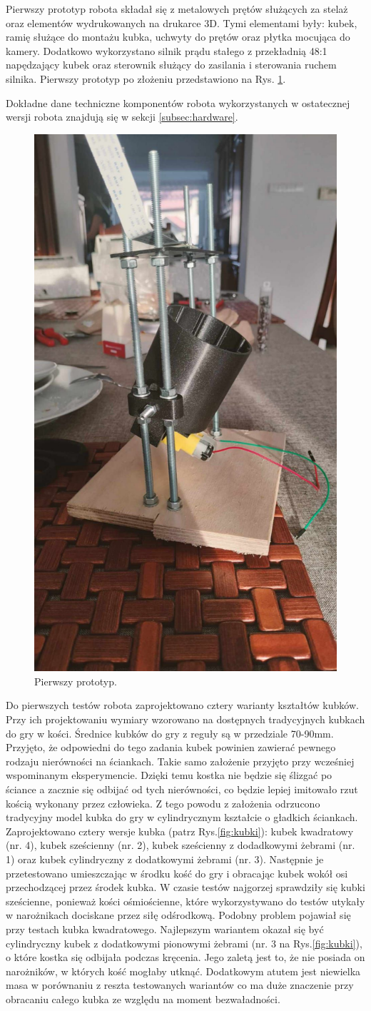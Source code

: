 Pierwszy prototyp robota składał się z metalowych prętów służących za stelaż oraz elementów wydrukowanych na drukarce 3D.
Tymi elementami były: kubek, ramię służące do montażu kubka, uchwyty do prętów oraz płytka mocująca do kamery. Dodatkowo
wykorzystano silnik prądu stałego z przekładnią 48:1 napędzający kubek oraz sterownik służący do zasilania i sterowania ruchem silnika. \cite{wheel} \cite{L298}
Pierwszy prototyp po złożeniu przedstawiono na Rys. \ref{fig:pierwszy}.

Dokładne dane techniczne komponentów robota wykorzystanych w ostatecznej wersji robota znajdują się w sekcji \ref{subsec:hardware}.

\begin{figure}[H]
    \centering
    \includegraphics[width=0.25\linewidth, trim={35mm 75mm 35mm 30mm}, clip]{chapters/03-praca-wlasna/figures/pierwszy}
    \caption{\label{fig:pierwszy}Pierwszy prototyp.}
\end{figure}

Do pierwszych testów robota zaprojektowano cztery warianty kształtów kubków. Przy ich projektowaniu wymiary wzorowano na dostępnych tradycyjnych kubkach do gry w kości.
Średnice kubków do gry z reguły są w przedziale 70-90mm.\cite{cup} Przyjęto, że odpowiedni do tego zadania kubek powinien
zawierać pewnego rodzaju nierówności na ściankach. Takie samo założenie przyjęto przy wcześniej wspominanym eksperymencie.\cite{PK} Dzięki temu kostka nie będzie się ślizgać po ściance a zacznie się odbijać od tych nierówności, co 
będzie lepiej imitowało rzut kością wykonany przez człowieka. Z tego powodu z założenia odrzucono tradycyjny model kubka do gry w cylindrycznym kształcie 
o gładkich ściankach. Zaprojektowano cztery wersje kubka (patrz Rys.\ref{fig:kubki}): kubek kwadratowy (nr. 4), kubek sześcienny (nr. 2), kubek sześcienny z dodadkowymi żebrami (nr. 1)
oraz kubek cylindryczny z dodatkowymi żebrami (nr. 3). 
Następnie je przetestowano umieszczając w środku kość do gry i obracając kubek wokół osi przechodzącej przez środek kubka. W czasie testów najgorzej sprawdziły się kubki sześcienne,
ponieważ kości ośmiościenne, które wykorzystywano do testów utykały w narożnikach dociskane przez siłę odśrodkową. Podobny problem pojawiał się przy testach kubka kwadratowego.
Najlepszym wariantem okazał się być cylindryczny kubek z dodatkowymi pionowymi żebrami (nr. 3 na Rys.\ref{fig:kubki}), o które kostka się odbijała podczas kręcenia.
Jego zaletą jest to, że nie posiada on narożników, w których kość mogłaby utknąć. Dodatkowym atutem jest niewielka masa w porównaniu z reszta testowanych wariantów co ma duże znaczenie 
przy obracaniu całego kubka ze względu na moment bezwaładności. \cite{bezwladnosc}

